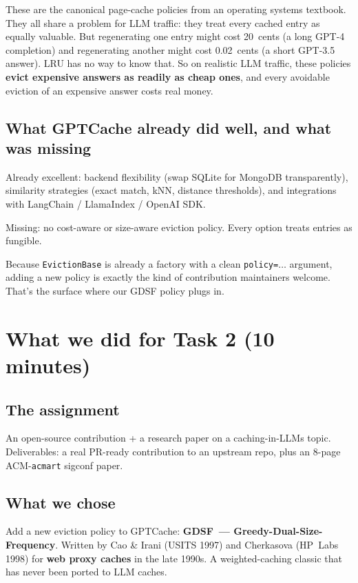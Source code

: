 \documentclass[11pt,a4paper]{article}
\begin{document}
These are the canonical page-cache policies from an operating systems
textbook. They all share a problem for LLM traffic: they treat every
cached entry as equally valuable. But regenerating one entry might cost
20~cents (a long GPT-4 completion) and regenerating another might cost
0.02~cents (a short GPT-3.5 answer). LRU has no way to know that. So on
realistic LLM traffic, these policies \textbf{evict expensive answers as
readily as cheap ones}, and every avoidable eviction of an expensive
answer costs real money.

\subsection{What GPTCache already did well, and what was missing}
Already excellent: backend flexibility (swap SQLite for MongoDB
transparently), similarity strategies (exact match, kNN, distance
thresholds), and integrations with LangChain / LlamaIndex / OpenAI SDK.

Missing: no cost-aware or size-aware eviction policy. Every option
treats entries as fungible.

Because \texttt{EvictionBase} is already a factory with a clean
\texttt{policy=$\dots$} argument, adding a new policy is exactly the
kind of contribution maintainers welcome. That's the surface where our
GDSF policy plugs in.

\section{What we did for Task 2 (10 minutes)}

\subsection{The assignment}
An open-source contribution + a research paper on a caching-in-LLMs
topic. Deliverables: a real PR-ready contribution to an upstream repo,
plus an 8-page ACM-\texttt{acmart} sigconf paper.

\subsection{What we chose}
Add a new eviction policy to GPTCache: \textbf{GDSF~---
Greedy-Dual-Size-Frequency}. Written by Cao \& Irani (USITS 1997) and
Cherkasova (HP~Labs 1998) for \textbf{web proxy caches} in the late
1990s. A weighted-caching classic that has never been ported to LLM
caches.
\end{document}
